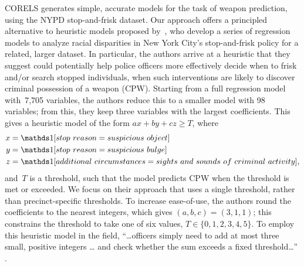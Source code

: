 CORELS generates simple, accurate models for the task of weapon prediction,
using the NYPD stop-and-frisk dataset.
%
Our approach offers a principled alternative to heuristic models proposed by~\citet{Goel16},
who develop a series of regression models to analyze racial disparities
in New York City's stop-and-frisk policy for a related, larger dataset.
%
In particular, the authors arrive at a heuristic that they suggest
could potentially help police officers more effectively decide when to
frisk and/or search stopped individuals, \ie when such
interventions are likely to discover criminal possession of a weapon (CPW).
%
Starting from a full regression model with~7,705 variables, the authors reduce this to a
smaller model with 98 variables; from this, they keep three variables with the largest coefficients.
%
This gives a heuristic model of the form ${ax + by + cz \ge T}$,
where
\begin{align}
x &= \one[stop~reason = suspicious~object] \nn \\
y &= \one[stop~reason = suspicious~bulge] \nn \\
z &= \one[additional~circumstances = sights~and~sounds~of~criminal~activity], \nn
\end{align}
and~$T$ is a threshold, such that the model predicts CPW when the threshold is met or exceeded.
%
We focus on their approach that uses a single threshold, rather than precinct-specific thresholds.
%
To increase ease-of-use, the authors round the coefficients
to the nearest integers, which gives ${(a, b, c) = (3, 1, 1)}$;
this constrains the threshold to take one of six values, ${T \in \{0, 1, 2, 3, 4, 5\}}$.
%
To employ this heuristic model in the field,
``\dots officers simply need to add at most three small, positive integers \dots
and check whether the sum exceeds a fixed threshold\dots'' \citep{Goel16}.

